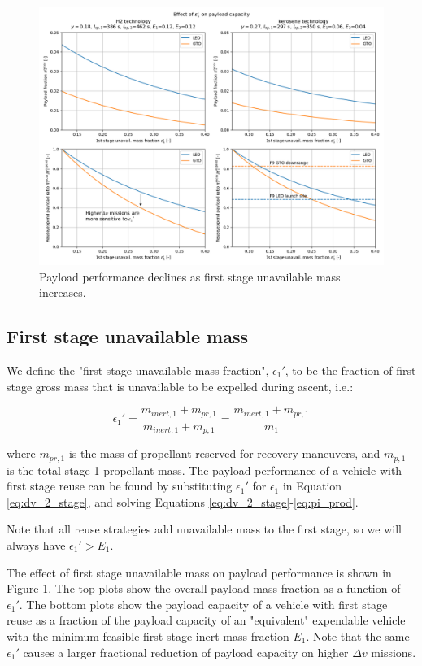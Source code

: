 \documentclass[conf]{new-aiaa}
\begin{document}
\begin{multicols}{2}
\begin{figure}
    \centering
    \includegraphics[width=\textwidth]{payload_vs_unavail_mass_annotated}
    \caption{\label{fig:payload_vs_unavail_mass} Payload performance declines as first stage unavailable mass increases.}
\end{figure}

\subsection{First stage unavailable mass}
We define the "first stage unavailable mass fraction", $\epsilon_1'$, to be the fraction of first stage gross mass that is unavailable to be expelled during ascent, i.e.:

\begin{equation}
\label{eq:epsilon_1_prime}
\epsilon_1' = \frac{m_{inert,1} + m_{pr,1}}{m_{inert,1} + m_{p,1}} = \frac{m_{inert,1} + m_{pr,1}}{m_1}
\end{equation}

where $m_{pr,1}$ is the mass of propellant reserved for recovery maneuvers, and $m_{p,1}$ is the total stage 1 propellant mass.
The payload performance of a vehicle with first stage reuse can be found by substituting $\epsilon_1'$ for $\epsilon_1$ in Equation \ref{eq:dv_2_stage}, and solving Equations \ref{eq:dv_2_stage}-\ref{eq:pi_prod}.

Note that all reuse strategies add unavailable mass to the first stage, so we will always have $\epsilon_1' > E_1$.

The effect of first stage unavailable mass on payload performance is shown in Figure \ref{fig:payload_vs_unavail_mass}. The top plots show the overall payload mass fraction as a function of $\epsilon_1'$. The bottom plots show the payload capacity of a vehicle with first stage reuse as a fraction of the payload capacity of an "equivalent" expendable vehicle with the minimum feasible first stage inert mass fraction $E_1$. Note that the same $\epsilon_1'$ causes a larger fractional reduction of payload capacity on higher $\Delta v$ missions.


\end{multicols}
\end{document}
